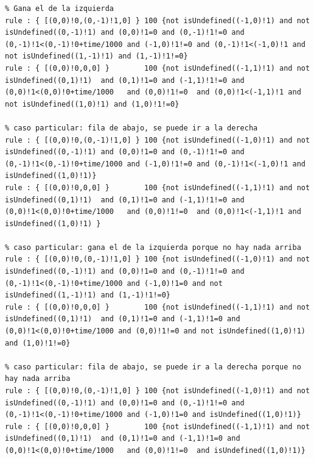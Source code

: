 \documentclass[10pt]{article}
\begin{document}
\begin{minipage}{1\textwidth}
	\centering
	\begin{lstlisting}
% Gana el de la izquierda
rule : { [(0,0)!0,(0,-1)!1,0] } 100 {not isUndefined((-1,0)!1) and not isUndefined((0,-1)!1) and (0,0)!1=0 and (0,-1)!1!=0 and (0,-1)!1<(0,-1)!0+time/1000 and (-1,0)!1!=0 and (0,-1)!1<(-1,0)!1 and not isUndefined((1,-1)!1) and (1,-1)!1!=0}
rule : { [(0,0)!0,0,0] }        100 {not isUndefined((-1,1)!1) and not isUndefined((0,1)!1)  and (0,1)!1=0 and (-1,1)!1!=0 and (0,0)!1<(0,0)!0+time/1000   and (0,0)!1!=0  and (0,0)!1<(-1,1)!1 and not isUndefined((1,0)!1) and (1,0)!1!=0}

% caso particular: fila de abajo, se puede ir a la derecha
rule : { [(0,0)!0,(0,-1)!1,0] } 100 {not isUndefined((-1,0)!1) and not isUndefined((0,-1)!1) and (0,0)!1=0 and (0,-1)!1!=0 and (0,-1)!1<(0,-1)!0+time/1000 and (-1,0)!1!=0 and (0,-1)!1<(-1,0)!1 and isUndefined((1,0)!1)}
rule : { [(0,0)!0,0,0] }        100 {not isUndefined((-1,1)!1) and not isUndefined((0,1)!1)  and (0,1)!1=0 and (-1,1)!1!=0 and (0,0)!1<(0,0)!0+time/1000   and (0,0)!1!=0  and (0,0)!1<(-1,1)!1 and isUndefined((1,0)!1) }

% caso particular: gana el de la izquierda porque no hay nada arriba
rule : { [(0,0)!0,(0,-1)!1,0] } 100 {not isUndefined((-1,0)!1) and not isUndefined((0,-1)!1) and (0,0)!1=0 and (0,-1)!1!=0 and (0,-1)!1<(0,-1)!0+time/1000 and (-1,0)!1=0 and not isUndefined((1,-1)!1) and (1,-1)!1!=0}
rule : { [(0,0)!0,0,0] }        100 {not isUndefined((-1,1)!1) and not isUndefined((0,1)!1)  and (0,1)!1=0 and (-1,1)!1=0 and (0,0)!1<(0,0)!0+time/1000 and (0,0)!1!=0 and not isUndefined((1,0)!1) and (1,0)!1!=0}

% caso particular: fila de abajo, se puede ir a la derecha porque no hay nada arriba
rule : { [(0,0)!0,(0,-1)!1,0] } 100 {not isUndefined((-1,0)!1) and not isUndefined((0,-1)!1) and (0,0)!1=0 and (0,-1)!1!=0 and (0,-1)!1<(0,-1)!0+time/1000 and (-1,0)!1=0 and isUndefined((1,0)!1)}
rule : { [(0,0)!0,0,0] }        100 {not isUndefined((-1,1)!1) and not isUndefined((0,1)!1)  and (0,1)!1=0 and (-1,1)!1=0 and (0,0)!1<(0,0)!0+time/1000   and (0,0)!1!=0  and isUndefined((1,0)!1)}
	\end{lstlisting}
\end{minipage}
\end{document}
